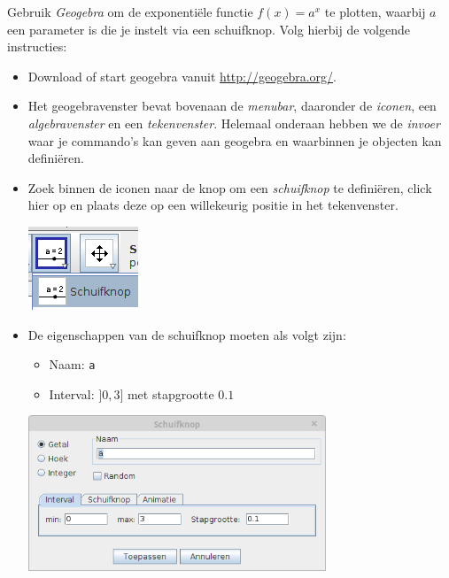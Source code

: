 \documentclass[12pt,twoside]{article}
\begin{document}
\begin{oefening}
Gebruik {\em Geogebra} om de exponentiële functie $f(x)=a^x$ te plotten, waarbij $a$ een parameter is die je instelt via een schuifknop. Volg hierbij de volgende instructies:
\begin{itemize}
  \item Download of start geogebra vanuit \url{http://geogebra.org/}.
  \item Het geogebravenster bevat bovenaan de {\em menubar}, daaronder de {\em iconen}, een {\em algebravenster} en een {\em tekenvenster}. Helemaal onderaan hebben we de {\em invoer} waar je commando's kan geven aan geogebra en waarbinnen je objecten kan definiëren.
  \item
  \begin{minipage}[t]{0.5\textwidth}
  \vspace{0pt}
  Zoek binnen de iconen naar de knop om een {\em schuifknop} te definiëren, click hier op en plaats deze op een willekeurig positie in het tekenvenster.
  \end{minipage}
  \begin{minipage}[t]{0.5\textwidth}
  \vspace{0pt}
  \begin{center}
    \includegraphics{gg_schuifknop_icoon}
  \end{center}
  \end{minipage}
  \item
  \begin{minipage}[t]{0.3\textwidth}
  \vspace{0pt}
  De eigenschappen van de schuifknop moeten als volgt zijn:
  \begin{itemize}
    \item Naam: \verb#a#
    \item Interval: $]0,3]$ met stapgrootte $0.1$
  \end{itemize}
  \end{minipage}
  \begin{minipage}[t]{0.7\textwidth}
  \vspace{0pt}
  \begin{center}
    \includegraphics[width=0.7\textwidth]{gg_schuifknop_eigenschappen}

\end{center}
\end{minipage}
\end{itemize}
\end{oefening}
\end{document}

